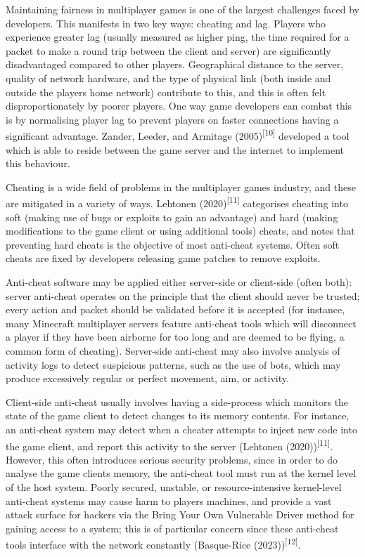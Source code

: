 \documentclass[
]{article}
\begin{document}
Maintaining fairness in multiplayer games is one of the largest
challenges faced by developers. This manifests in two key ways: cheating
and lag. Players who experience greater lag (usually measured as higher
ping, the time required for a packet to make a round trip between the
client and server) are significantly disadvantaged compared to other
players. Geographical distance to the server, quality of network
hardware, and the type of physical link (both inside and outside the
player\textquotesingle s home network) contribute to this, and this is
often felt disproportionately by poorer players. One way game developers
can combat this is by normalising player lag to prevent players on
faster connections having a significant advantage. Zander, Leeder, and
Armitage (2005)\textsuperscript{{[}10{]}} developed a tool which is able
to reside between the game server and the internet to implement this
behaviour.

Cheating is a wide field of problems in the multiplayer games industry,
and these are mitigated in a variety of ways. Lehtonen
(2020)\textsuperscript{{[}11{]}} categorises cheating into soft (making
use of bugs or exploits to gain an advantage) and hard (making
modifications to the game client or using additional tools) cheats, and
notes that preventing hard cheats is the objective of most anti-cheat
systems. Often soft cheats are fixed by developers releasing game
patches to remove exploits.

Anti-cheat software may be applied either server-side or client-side
(often both): server anti-cheat operates on the principle that the
client should never be trusted; every action and packet should be
validated before it is accepted (for instance, many Minecraft
multiplayer servers feature anti-cheat tools which will disconnect a
player if they have been airborne for too long and are deemed to be
\textquotesingle flying\textquotesingle, a common form of cheating).
Server-side anti-cheat may also involve analysis of activity logs to
detect suspicious patterns, such as the use of bots, which may produce
excessively regular or perfect movement, aim, or activity.

Client-side anti-cheat usually involves having a side-process which
monitors the state of the game client to detect changes to its memory
contents. For instance, an anti-cheat system may detect when a cheater
attempts to inject new code into the game client, and report this
activity to the server (Lehtonen (2020))\textsuperscript{{[}11{]}}.
However, this often introduces serious security problems, since in order
to do analyse the game client\textquotesingle s memory, the anti-cheat
tool must run at the kernel level of the host system. Poorly secured,
unstable, or resource-intensive kernel-level anti-cheat systems may
cause harm to players\textquotesingle{} machines, and provide a vast
attack surface for hackers via the \textquotesingle Bring Your Own
Vulnerable Driver\textquotesingle{} method for gaining access to a
system; this is of particular concern since these anti-cheat tools
interface with the network constantly (Basque-Rice
(2023))\textsuperscript{{[}12{]}}.
\end{document}
